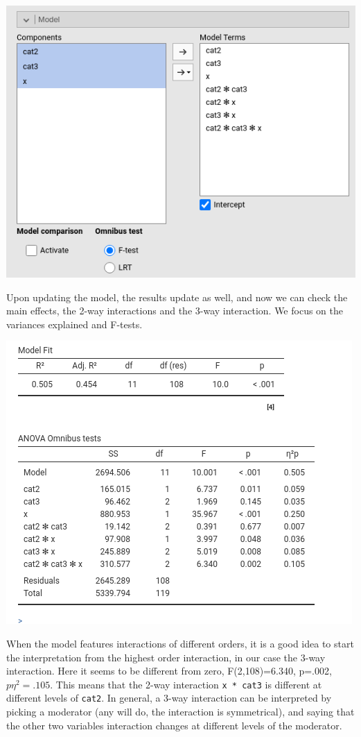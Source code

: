\documentclass[
]{book}
\begin{document}
\includegraphics{bookletpics/2_ancova_input3.png}

Upon updating the model, the results update as well, and now we can check the main effects, the 2-way interactions and the 3-way interaction. We focus on the variances explained and F-tests.

\includegraphics{bookletpics/2_ancova_output3.png}

When the model features interactions of different orders, it is a good idea to start the interpretation from the highest order interaction, in our case the 3-way interaction. Here it seems to be different from zero, F(2,108)=6.340, p=.002, \(p\eta^2=.105\).
This means that the 2-way interaction \texttt{x\ *\ cat3} is different at different levels of \texttt{cat2}. In general, a 3-way interaction can be interpreted by picking a moderator (any will do, the interaction is symmetrical), and saying that the other two variables interaction changes at different levels of the moderator.
\end{document}
